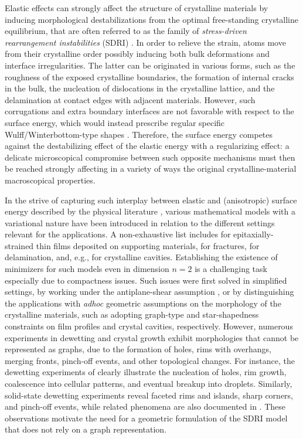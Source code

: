 \documentclass[reqno]{amsart}
\numberwithin{equation}{section}
\theoremstyle{plain}
\theoremstyle{definition}
\begin{document}
Elastic effects can strongly affect the structure of crystalline materials by inducing morphological destabilizations  from the optimal free-standing crystalline equilibrium, that are often referred to as the family of \emph{stress-driven rearrangement instabilities} (SDRI)  \cite{AT:1972,D:2001,FG:2004,Gr:1993,Srolovitz:1989}. In order to relieve the strain, atoms move from their crystalline order possibly inducing  both bulk deformations and interface irregularities. The latter can be originated in various forms, such as the roughness of the exposed crystalline boundaries, the formation of internal cracks in the bulk, the nucleation of dislocations in the crystalline lattice, and the delamination at contact edges with adjacent materials. However, such corrugations and extra boundary interfaces are not favorable with respect to the surface energy, which would instead prescribe regular specific Wulff/Winterbottom-type shapes \cite{PV:2022,PV:2023,Winterbottom,Wulff01}. Therefore, the surface energy competes against the destabilizing effect of the elastic energy with a regularizing effect: a delicate microscopical compromise between such opposite mechanisms  must then be reached strongly affecting in a variety of ways the original crystalline-material macroscopical properties.  

In the strive of capturing such interplay between elastic and (anisotropic) surface energy described by the physical literature  \cite{Deng:1995,HS:1991,Baldelli:2013,SMV:2004,Spencer:1999,WL:2003,Xia:2000}, various mathematical  models with a variational nature have been introduced in relation to the different  settings relevant for the applications. A non-exhaustive list includes \cite{BGZ:2015,BCh:2002,DP:2018_1,DP:2018_2,FFLM:2007,GZ:2014,KP:2021} for epitaxially-strained thin films deposited on supporting materials, \cite{BFM:2008,CCF:2016,FGL:2019} for fractures, \cite{Babadjian:2016,Baldelli:2014} for delamination, and, e.g.,  \cite{FFLM:2011} for crystalline cavities. Establishing the existence of minimizers for such models even in dimension $n=2$ is a challenging task especially due to compactness issues. Such issues were first solved in simplified settings, by working under the antiplane-shear assumption \cite{Bonaci:2015,ChS:2007}, or by distinguishing the applications with \emph{adhoc} geometric assumptions on the morphology of the crystalline materials, such as adopting graph-type  and star-shapedness constraints on film profiles and crystal cavities, respectively.
%
However, numerous experiments in dewetting and crystal growth exhibit morphologies that cannot be represented as graphs, due to the formation of holes, rims with overhangs, merging fronts, pinch-off events, and other topological changes. For instance, the dewetting experiments of \cite{R:1992,R:1994} clearly illustrate the nucleation of holes, rim growth, coalescence into cellular patterns, and eventual breakup into droplets. Similarly, solid-state dewetting experiments \cite{KGT:2009,RG:2021} reveal faceted rims and islands, sharp corners, and pinch-off events, while related phenomena are also documented in \cite{SS:1986}.
%
These observations motivate the need for a geometric formulation of the SDRI model that does not rely on a graph representation.
\end{document}
